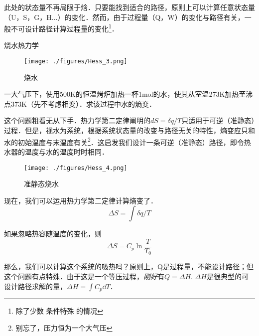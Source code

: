 此处的状态量不再局限于焓．只要能找到适合的路径，原则上可以计算任意状态量（U，S，G，H...）的变化．然而，由于过程量（Q，W）的变化与路径有关，一般不可设计路径计算过程量的变化\footnote{除了少数 条件特殊 的情况}．

\begin{example}{烧水热力学}
\begin{figure}[ht]
\centering
\texttt{[image: ./figures/Hess\_3.png]}
\caption{烧水} \label{Hess_fig3}
\end{figure}
一大气压下，使用500K的恒温烤炉加热一杯1mol的水，使其从室温273K加热至沸点373K（先不考虑相变）．求该过程中水的熵变．

这个问题粗看无从下手．热力学第二定律阐明的$dS=\delta q/T$只适用于可逆（准静态）过程．但是，视水为系统，根据系统状态量的改变与路径无关的特性，熵变应只和水的初始温度与末温度有关\footnote{别忘了，压力恒为一个大气压}．这启发我们设计一条可逆（准静态）路径，即令热水器的温度与水的温度时时相同．

\begin{figure}[ht]
\centering
\texttt{[image: ./figures/Hess\_4.png]}
\caption{准静态烧水} \label{Hess_fig4}
\end{figure}
现在，我们可以运用热力学第二定律计算熵变了．
$$\Delta S=\int \delta q/T$$

如果忽略热容随温度的变化，则 
$$\Delta S=C_p \ln \frac{T}{T_0}$$

那么，我们可以计算这个系统的吸热吗？原则上，Q是过程量，不能设计路径；但这个问题有点特殊．由于这是一个等压过程，\textsl{刚好}有$Q=\Delta H$. $\Delta H$是很典型的可设计路径求解的量，$\Delta H = \int C_p \dd T$．
\end{example}
